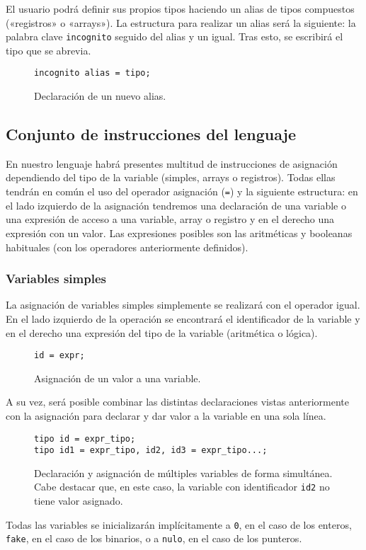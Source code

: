 El usuario podrá definir sus propios tipos haciendo un alias de tipos
compuestos («registros» o «arrays»). La estructura para realizar un alias será la
siguiente: la palabra clave \lstinline{incognito} seguido del alias y un igual. Tras esto,
se escribirá el tipo que se abrevia.
\begin{figure}[htbp]
    \centering
    \begin{lstlisting}
incognito alias = tipo;
    \end{lstlisting}
    \caption{Declaración de un nuevo alias.}
\end{figure}

\subsection{Conjunto de instrucciones del lenguaje}
En nuestro lenguaje habrá presentes multitud de instrucciones de asignación
dependiendo del tipo de la variable (simples, arrays o registros). Todas ellas
tendrán en común el uso del operador asignación (\lstinline{=}) y la siguiente
estructura: en el lado izquierdo de la asignación tendremos una declaración de
una variable o una expresión de acceso a una variable, array o registro y en el
derecho una expresión con un valor. Las expresiones posibles son las aritméticas
y booleanas habituales (con los operadores anteriormente definidos). 

\subsubsection{Variables simples}
La asignación de variables simples simplemente se realizará con el operador
igual. En el lado izquierdo de la operación se encontrará el identificador de la
variable y en el derecho una expresión del tipo de la variable (aritmética o
lógica).
\begin{figure}[htbp]
    \centering
    \begin{lstlisting}
id = expr;
    \end{lstlisting}
    \caption{Asignación de un valor a una variable.}
\end{figure}
A su vez, será posible combinar las distintas declaraciones vistas anteriormente
con la asignación para declarar y dar valor a la variable en una sola línea.
\begin{figure}[htbp]
    \centering
    \begin{lstlisting}
tipo id = expr_tipo;
tipo id1 = expr_tipo, id2, id3 = expr_tipo...;
    \end{lstlisting}
    \caption{Declaración y asignación de múltiples variables de forma
    simultánea. Cabe destacar que, en este caso, la variable con identificador \lstinline{id2}
    no tiene valor asignado.}
\end{figure}
Todas las variables se inicializarán implícitamente a \lstinline{0}, en el caso de los
enteros, \lstinline{fake}, en el caso de los binarios, o a \lstinline{nulo}, en
el caso de los punteros.

